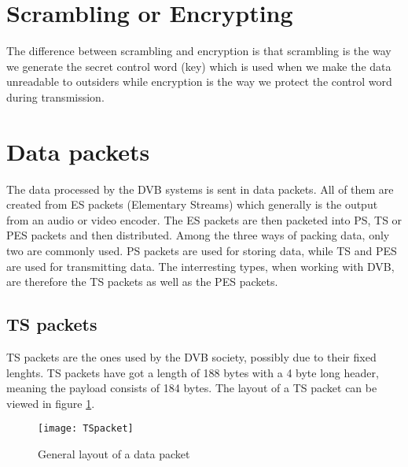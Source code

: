 
\section{Scrambling or Encrypting}
The difference between scrambling and encryption is that scrambling is the
way we generate the secret control word (key) which is used when we make the
data unreadable to outsiders while encryption is the way we protect the control 
word during transmission.

\section{Data packets}\label{sec:Data}
The data processed by the DVB systems is sent in data packets. All of them are 
created from ES packets (Elementary Streams) which generally is the output from 
an audio or video encoder. The ES packets are then packeted into PS, TS or PES 
packets and then distributed. Among the three ways of packing data, only two are 
commonly used. PS packets are used for storing data, while TS and PES are used 
for transmitting data. The interresting types, when working with DVB, are 
therefore the TS packets as well as the PES packets.

\subsection{TS packets}
TS packets are the ones used by the DVB society, possibly due to their fixed 
lenghts. TS packets have got a length of 188 bytes with a 4 byte long header, 
meaning the payload consists of 184 bytes. The layout of a TS packet can be 
viewed in figure \ref{img:Package}.

\begin{figure}
  \texttt{[image: TSpacket]}
  \caption{General layout of a data packet \citep{DVB:2013}}
  \label{img:Package}
\end{figure}

